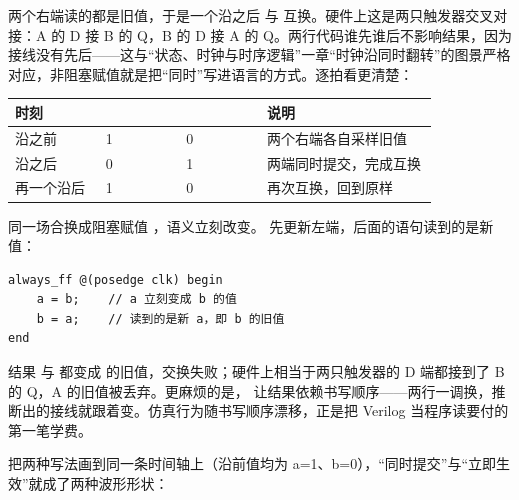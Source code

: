 两个右端读的都是旧值，于是一个沿之后  与  互换。硬件上这是两只触发器交叉对接：A 的 D 接 B 的 Q，B 的 D 接 A 的 Q。两行代码谁先谁后不影响结果，因为接线没有先后——这与“状态、时钟与时序逻辑”一章“时钟沿同时翻转”的图景严格对应，非阻塞赋值就是把“同时”写进语言的方式。逐拍看更清楚：

\begin{longtable}{L{0.18\linewidth}L{0.16\linewidth}L{0.16\linewidth}L{0.34\linewidth}}
\toprule
时刻 &  &  & 说明 \\
\midrule
沿之前 & 1 & 0 & 两个右端各自采样旧值 \\\tablerowrule
沿之后 & 0 & 1 & 两端同时提交，完成互换 \\\tablerowrule
再一个沿后 & 1 & 0 & 再次互换，回到原样 \\
\bottomrule
\end{longtable}

同一场合换成阻塞赋值 \code{=}，语义立刻改变。\code{=} 先更新左端，后面的语句读到的是新值：

\begin{lstlisting}
always_ff @(posedge clk) begin
    a = b;    // a 立刻变成 b 的值
    b = a;    // 读到的是新 a，即 b 的旧值
end
\end{lstlisting}

结果  与  都变成  的旧值，交换失败；硬件上相当于两只触发器的 D 端都接到了 B 的 Q，A 的旧值被丢弃。更麻烦的是，\code{=} 让结果依赖书写顺序——两行一调换，推断出的接线就跟着变。仿真行为随书写顺序漂移，正是把 Verilog 当程序读要付的第一笔学费。

把两种写法画到同一条时间轴上（沿前值均为 a=1、b=0），“同时提交”与“立即生效”就成了两种波形形状：

